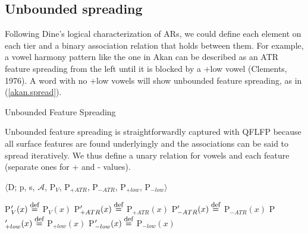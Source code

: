 \documentclass[,doc,floatsintext]{apa6}
\def\defeq{\mathrel{\buildrel \mbox{\footnotesize def} \over =}}
\theoremstyle{definition}
\theoremstyle{definition}
\theoremstyle{definition}
\theoremstyle{remark}
\begin{document}
\subsection{Unbounded spreading}\label{unbounded-spreading}

Following Dine's logical characterization of ARs, we could define each
element on each tier and a binary association relation that holds
between them. For example, a vowel harmony pattern like the one in Akan
can be described as an ATR feature spreading from the left until it is
blocked by a +low vowel (Clements, 1976). A word with no +low vowels
will show unbounded feature spreading, as in (\ref{akan.spread}).

\begin{exe}
\ex \label{akan.spread} Unbounded Feature Spreading \\
\end{exe}

\noindent Unbounded feature spreading is straightforwardly captured with
QFLFP because all surface features are found underlyingly and the
associations can be said to spread iteratively. We thus define a unary
relation for vowels and each feature (separate ones for + and - values).

\begin{exe}
\ex\label{qflfp.spread} $\langle$D; p, s, $\mathcal{A}$, P$_V$, P$_{+ATR}$, P$_{-ATR}$, P$_{+low}$, P$_{-low}\rangle$ 
\end{exe}

\noindent P\('_{V}(x) \defeq\) P\(_{V}(x)\)\newline
P\('_{+ATR}(x) \defeq\) P\(_{+ATR}(x)\) \hspace{0.5in}
P\('_{-ATR}(x) \defeq\) P\(_{-ATR}(x)\)\newline
P\('_{+low}(x) \defeq\) P\(_{+low}(x)\) \hspace{0.5in}
P\('_{-low}(x) \defeq\) P\(_{-low}(x)\)\newline
\end{document}
